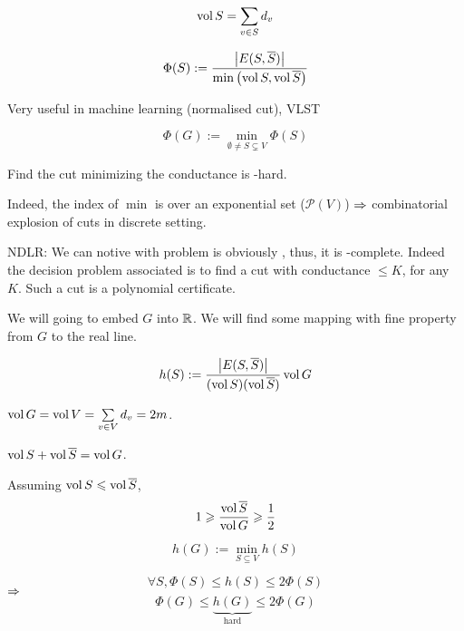 \begin{definition}[Volume]
    \[
        \operatorname{vol} S = \sum\limits_{v\in S}d_v
    \]
\end{definition}
    
\begin{definition}
    \[
        \Phi(S) := \frac{\left\lvert E(S,\overline{S})\right\rvert}{\min\left(\operatorname{vol} S,\operatorname{vol} \overline{S}\right)}
    \]
\end{definition}

Very useful in machine learning (normalised cut), VLST %

\begin{definition}
    \[
        \Phi(G) := \min\limits_{\emptyset \neq S \subsetneq V} \Phi(S)
    \]
\end{definition}

\begin{theorem}
    Find the cut minimizing the conductance is \NP-hard.
\end{theorem}
Indeed, the index of $\min$ is over an exponential set ($\mathcal{P}(V)$) $\Rightarrow$ combinatorial explosion of cuts in discrete setting.

NDLR: We can notive with problem is obviously \NP, thus, it is \NP-complete. Indeed the decision problem associated is to find a cut with conductance $\leqslant K$, for any $K$. Such a cut is a polynomial certificate.

We will going to embed $G$ into $\mathbb{R}$. We will find some mapping with fine property from $G$ to the real line.

\begin{definition}
    \[
        h(S) := \frac{\left\lvert E(S,\overline{S})\right\rvert}{(\operatorname{vol} S)(\operatorname{vol} \overline{S})} \operatorname{vol} G
    \]
\end{definition}

$\operatorname{vol} G = \operatorname{vol} V = \sum\limits_{v\in V} d_v = 2m$.

$\operatorname{vol} S + \operatorname{vol} \overline{S} = \operatorname{vol} G$.

Assuming $\operatorname{vol} S \leqslant \operatorname{vol} \overline{S}$,
\[
    1 \geqslant \frac{\operatorname{vol} \overline{S}}{\operatorname{vol} G} \geqslant \frac{1}{2}
\]

\begin{definition}
    \[
        h(G) := \min\limits_{S\subseteq V} h(S)
    \]
\end{definition}

\[
    \forall S, \Phi(S) \leqslant h(S) \leqslant 2 \Phi(S)
\]
$\Rightarrow$
\[
    \Phi(G) \leqslant \underbrace{h(G)}_{\text{hard}} \leqslant 2 \Phi(G)
\]


